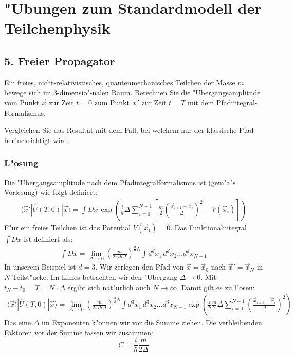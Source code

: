 \documentclass[11pt,a4paper]{article}
\begin{document}
\section*{"Ubungen zum Standardmodell der Teilchenphysik}
\subsection*{5. Freier Propagator}
Ein freies, nicht-relativistisches, quantenmechanisches Teilchen der Masse $m$ bewege sich im 3-dimensio"-nalen Raum. Berechnen Sie die "Ubergangsamplitude vom Punkt $\vec{x}$ zur Zeit $t = 0$ zum Punkt $\vec{x}'$ zur Zeit $t = T$ mit dem Pfadintegral-Formalismus.\par
Vergleichen Sie das Resultat mit dem Fall, bei welchem nur der klassische Pfad ber"ucksichtigt wird.
\subsubsection*{L"osung}
Die "Ubergangsamplitude nach dem Pfadintegralformalismus ist (gem"a"s Vorlesung) wie folgt definiert:
\begin{eqnarray}
\langle\vec{x}'|\hat{U}(T,0)|\vec{x}\rangle = \int Dx \, \exp\left(\frac{i}{\hbar}\Delta\sum_{i=0}^{N-1}\left[\frac{m}{2}\left(\frac{\vec{x}_{i+1}-\vec{x}_i}{\Delta}\right)^2 - V(\vec{x}_i) \right]\right)
\end{eqnarray}
F"ur ein freies Teilchen ist das Potential $V(\vec{x}_i)=0$. Das Funktionalintegral $\int Dx$ ist definiert als:
\begin{eqnarray}
\int Dx = \lim_{\Delta\to0} \left( \frac{m}{2\pi i\hbar\Delta}\right)^{\frac{d}{2}N}\int d^dx_1 \, d^dx_2 \ldots d^dx_{N-1}
\end{eqnarray}
In unserem Beispiel ist $d=3$. Wir zerlegen den Pfad von $\vec{x} = \vec{x}_0$ nach $\vec{x}' = \vec{x}_N$ in $N$ Teilst"ucke. Im Limes betrachten wir den "Ubergang $\Delta\to0$. Mit $t_N - t_0 = T = N \cdot \Delta$ ergibt sich nat"urlich auch $N\to\infty$. Damit gilt es zu l"osen:
\begin{eqnarray}
\langle\vec{x}'|\hat{U}(T,0)|\vec{x}\rangle = \lim_{\Delta\to0} \left( \frac{m}{2\pi i\hbar\Delta}\right)^{\frac{3}{2}N}\int d^3x_1 \, d^3x_2 \ldots d^3x_{N-1} \exp\left(\frac{i}{\hbar}\frac{m}{2}\Delta \sum_{i=0}^{N-1}\left(\frac {\vec{x}_{i+1}-\vec{x}_i}{\Delta}\right)^2\right)
\end{eqnarray}
Das eine $\Delta$ im Exponenten k"onnen wir vor die Summe ziehen. Die verbleibenden Faktoren vor der Summe fassen wir zusammen:
\[C = \frac{i}{\hbar}\frac{m}{2\Delta}\]
\end{document}
